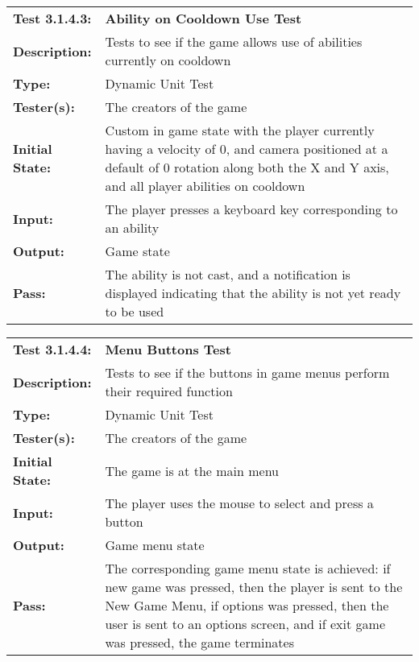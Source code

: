 \documentclass[12pt, titlepage]{article}
\begin{document}
\begin{enumerate}
\begin{mdframed}[linewidth=1pt]
\begin{tabularx}{\textwidth}{@{}p{3cm}X@{}}
{\bf Test 3.1.4.3:} & {\bf Ability on Cooldown Use Test}\\[\baselineskip]
{\bf Description:} & Tests to see if the game allows use of abilities currently on cooldown\\[0.5\baselineskip]
{\bf Type:} & Dynamic Unit Test\\[0.5\baselineskip]
{\bf Tester(s):} & The creators of the game\\[0.5\baselineskip]
{\bf Initial State:} & Custom in game state with the player currently having a velocity of 0, and camera positioned at a default of 0 rotation along both the X and Y axis, and all player abilities on cooldown\\[0.5\baselineskip]
{\bf Input:} & The player presses a keyboard key corresponding to an ability \\[0.5\baselineskip]
{\bf Output:} & Game state\\[0.5\baselineskip]
{\bf Pass:} & The ability is not cast, and a notification is displayed indicating that the ability is not yet ready to be used
\end{tabularx}
\end{mdframed}

\begin{mdframed}[linewidth=1pt]
\begin{tabularx}{\textwidth}{@{}p{3cm}X@{}}
{\bf Test 3.1.4.4:} & {\bf Menu Buttons Test}\\[\baselineskip]
{\bf Description:} & Tests to see if the buttons in game menus perform their required function\\[0.5\baselineskip]
{\bf Type:} & Dynamic Unit Test\\[0.5\baselineskip]
{\bf Tester(s):} & The creators of the game\\[0.5\baselineskip]
{\bf Initial State:} & The game is at the main menu\\[0.5\baselineskip]
{\bf Input:} & The player uses the mouse to select and press a button \\[0.5\baselineskip]
{\bf Output:} & Game menu state\\[0.5\baselineskip]
{\bf Pass:} & The corresponding game menu state is achieved: if new game was pressed, then the player is sent to the New Game Menu, if options was pressed, then the user is sent to an options screen, and if exit game was pressed, the game terminates
\end{tabularx}
\end{mdframed}


\end{enumerate}
\end{document}
